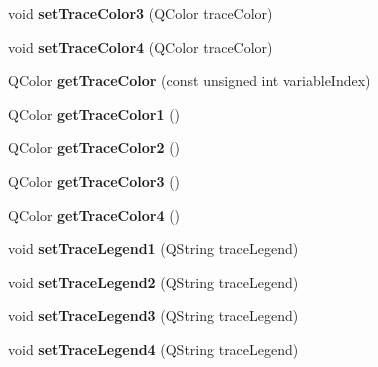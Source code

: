 \begin{DoxyCompactItemize}
\item 
\hypertarget{classQEPlot_a89c5f06f94aef5b6374f42b042ad1d8b}{
void {\bfseries setTraceColor3} (QColor traceColor)}
\label{classQEPlot_a89c5f06f94aef5b6374f42b042ad1d8b}

\item 
\hypertarget{classQEPlot_a037f048f45b1a50ee3a71da884db5fa4}{
void {\bfseries setTraceColor4} (QColor traceColor)}
\label{classQEPlot_a037f048f45b1a50ee3a71da884db5fa4}

\item 
\hypertarget{classQEPlot_a968051ae7bfbedec89d33e3c4b1a4451}{
QColor {\bfseries getTraceColor} (const unsigned int variableIndex)}
\label{classQEPlot_a968051ae7bfbedec89d33e3c4b1a4451}

\item 
\hypertarget{classQEPlot_a1fbb18f532e781025c98fc05ff34976e}{
QColor {\bfseries getTraceColor1} ()}
\label{classQEPlot_a1fbb18f532e781025c98fc05ff34976e}

\item 
\hypertarget{classQEPlot_a821e21e2d2546290f45322bc6013b828}{
QColor {\bfseries getTraceColor2} ()}
\label{classQEPlot_a821e21e2d2546290f45322bc6013b828}

\item 
\hypertarget{classQEPlot_a400b85f42b302cd1c27f2ca58ea3a924}{
QColor {\bfseries getTraceColor3} ()}
\label{classQEPlot_a400b85f42b302cd1c27f2ca58ea3a924}

\item 
\hypertarget{classQEPlot_abe8ae852bbb95a5afb616e051ac0c425}{
QColor {\bfseries getTraceColor4} ()}
\label{classQEPlot_abe8ae852bbb95a5afb616e051ac0c425}

\item 
\hypertarget{classQEPlot_a6830abeb10a857288200b56c36e8eb51}{
void {\bfseries setTraceLegend1} (QString traceLegend)}
\label{classQEPlot_a6830abeb10a857288200b56c36e8eb51}

\item 
\hypertarget{classQEPlot_a0a70b150f3127524bc6e6a0774ea9742}{
void {\bfseries setTraceLegend2} (QString traceLegend)}
\label{classQEPlot_a0a70b150f3127524bc6e6a0774ea9742}

\item 
\hypertarget{classQEPlot_a801f91a8a70ebe61041eca7980aed504}{
void {\bfseries setTraceLegend3} (QString traceLegend)}
\label{classQEPlot_a801f91a8a70ebe61041eca7980aed504}

\item 
\hypertarget{classQEPlot_a52aedc06fd14df4c54a812713597d15b}{
void {\bfseries setTraceLegend4} (QString traceLegend)}
\label{classQEPlot_a52aedc06fd14df4c54a812713597d15b}


\end{DoxyCompactItemize}
